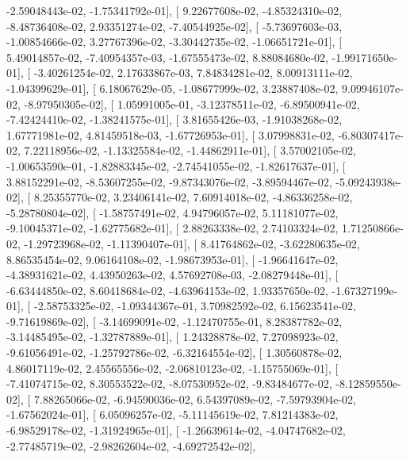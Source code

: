 \documentclass{article}
\begin{document}
         -2.59048443e-02,  -1.75341792e-01],
       [  9.22677608e-02,  -4.85324310e-02,  -8.48736408e-02,
          2.93351274e-02,  -7.40544925e-02],
       [ -5.73697603e-03,  -1.00854666e-02,   3.27767396e-02,
         -3.30442735e-02,  -1.06651721e-01],
       [  5.49014857e-02,  -7.40954357e-03,  -1.67555473e-02,
          8.88084680e-02,  -1.99171650e-01],
       [ -3.40261254e-02,   2.17633867e-03,   7.84834281e-02,
          8.00913111e-02,  -1.04399629e-01],
       [  6.18067629e-05,  -1.08677999e-02,   3.23887408e-02,
          9.09946107e-02,  -8.97950305e-02],
       [  1.05991005e-01,  -3.12378511e-02,  -6.89500941e-02,
         -7.42424410e-02,  -1.38241575e-01],
       [  3.81655426e-03,  -1.91038268e-02,   1.67771981e-02,
          4.81459518e-03,  -1.67726953e-01],
       [  3.07998831e-02,  -6.80307417e-02,   7.22118956e-02,
         -1.13325584e-02,  -1.44862911e-01],
       [  3.57002105e-02,  -1.00653590e-01,  -1.82883345e-02,
         -2.74541055e-02,  -1.82617637e-01],
       [  3.88152291e-02,  -8.53607255e-02,  -9.87343076e-02,
         -3.89594467e-02,  -5.09243938e-02],
       [  8.25355770e-02,   3.23406141e-02,   7.60914018e-02,
         -4.86336258e-02,  -5.28780804e-02],
       [ -1.58757491e-02,   4.94796057e-02,   5.11181077e-02,
         -9.10045371e-02,  -1.62775682e-01],
       [  2.88263338e-02,   2.74103324e-02,   1.71250866e-02,
         -1.29723968e-02,  -1.11390407e-01],
       [  8.41764862e-02,  -3.62280635e-02,   8.86535454e-02,
          9.06164108e-02,  -1.98673953e-01],
       [ -1.96641647e-02,  -4.38931621e-02,   4.43950263e-02,
          4.57692708e-03,  -2.08279448e-01],
       [ -6.63444850e-02,   8.60418684e-02,  -4.63964153e-02,
          1.93357650e-02,  -1.67327199e-01],
       [ -2.58753325e-02,  -1.09344367e-01,   3.70982592e-02,
          6.15623541e-02,  -9.71619869e-02],
       [ -3.14699091e-02,  -1.12470755e-01,   8.28387782e-02,
         -3.14485495e-02,  -1.32787889e-01],
       [  1.24328878e-02,   7.27098923e-02,  -9.61056491e-02,
         -1.25792786e-02,  -6.32164554e-02],
       [  1.30560878e-02,   4.86017119e-02,   2.45565556e-02,
         -2.06810123e-02,  -1.15755069e-01],
       [ -7.41074715e-02,   8.30553522e-02,  -8.07530952e-02,
         -9.83484677e-02,  -8.12859550e-02],
       [  7.88265066e-02,  -6.94590036e-02,   6.54397089e-02,
         -7.59793904e-02,  -1.67562024e-01],
       [  6.05096257e-02,  -5.11145619e-02,   7.81214383e-02,
         -6.98529178e-02,  -1.31924965e-01],
       [ -1.26639614e-02,  -4.04747682e-02,  -2.77485719e-02,
         -2.98262604e-02,  -4.69272542e-02],
\end{document}
